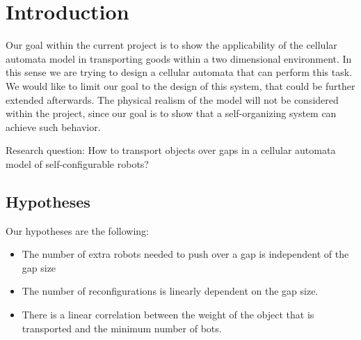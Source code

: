 \section{Introduction}
\label{sec:intro}

Our goal within the current project is to show the applicability of the cellular automata model in transporting goods within a two dimensional environment. In this sense we are trying to design a cellular automata that can perform this task. We would like to limit our goal to the design of this system, that could be further extended afterwards. The physical realism of the model will not be considered within the project, since our goal is to show that a self-organizing system can achieve such behavior.

Research question: How to transport objects over gaps in a cellular automata model of self-configurable robots?

\subsection{Hypotheses}
Our hypotheses are the following:
\begin{itemize}
 \item The number of extra robots needed to push over a gap is independent of the gap size
 \item The number of reconfigurations is linearly dependent on the gap size.
 \item There is a linear correlation between the weight of the object that is transported and the minimum number of bots.
\end{itemize}
